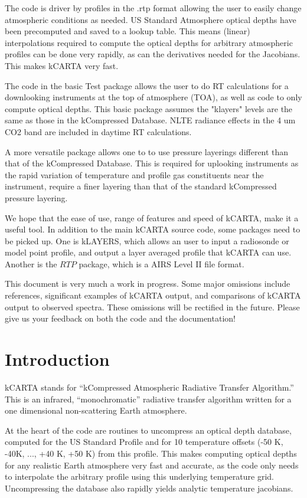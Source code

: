 \documentclass[12pt]{article}
\newcommand{\kc}{\textsf{kCARTA}\xspace}
\newcommand{\kl}{\textsf{kLAYERS}\xspace}
\begin{document}
The code is driver by profiles in the .rtp format allowing the user to easily 
change atmospheric conditions as needed. US Standard Atmosphere optical 
depths have been precomputed and saved to a lookup table. This means (linear)
interpolations required to compute the optical depths for arbitrary atmospheric
profiles can be done very rapidly, as can the derivatives needed for 
the Jacobians. This makes \kc very fast. 

The code in the basic Test package allows the user to do RT calculations for 
a downlooking instruments at the top of atmosphere (TOA), as well as code to 
only compute optical depths. This basic package assumes the "klayers" levels
are the same as those in the kCompressed Database. NLTE radiance effects in the
4 um CO2 band are included in daytime RT calculations.

A more versatile package allows one to to use pressure layerings different
than that of the kCompressed Database. This is required for uplooking 
instruments as the rapid variation of temperature and profile gas constituents
near the instrument, require a finer layering than that of the standard
kCompressed pressure layering. 

We hope that the ease of use, range of features and speed of \kc, make it a 
useful tool. In addition to the main \kc source code, some packages need to be 
picked up. One is \kl, which allows an user to input a radiosonde or 
model point profile, and output a layer averaged profile that \kc can use. 
Another is the $RTP$ package, which is a AIRS Level II file format. 

This document is very much a work in progress.  Some major omissions
include references, significant examples of \kc output, and
comparisons of \kc output to observed spectra.  These omissions will
be rectified in the future.  Please give us your feedback on both the
code and the documentation!

\newpage
\section{Introduction}

\kc stands for ``kCompressed Atmospheric Radiative Transfer
Algorithm.''  This is an infrared, ``monochromatic'' radiative
transfer algorithm written for a one dimensional non-scattering Earth
atmosphere. 

At the heart of the code are routines to uncompress an optical depth database,
computed for the US Standard Profile and for 10 temperature offsets 
(-50 K, -40K, ..., +40 K, +50 K) from this profile. This makes computing 
optical depths for any realistic Earth atmosphere very fast and accurate, as 
the code only needs to interpolate the arbitrary profile using this underlying
temperature grid. Uncompressing the database also rapidly yields analytic 
temperature jacobians. 
\end{document}

